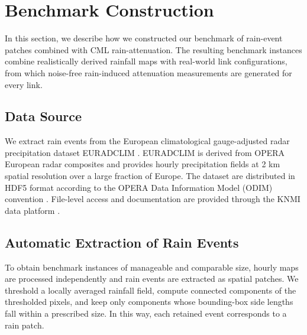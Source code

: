 \documentclass[a4paper,fleqn]{cas-sc}
\newcommand{\notebox}[3]{%
  \begingroup
  \setlength{\fboxsep}{2pt}%
  \fcolorbox{#1}{#2}{\textsf{\footnotesize #3}}%
  \endgroup
}
\DeclareRobustCommand{\editnote}[1]{%
  \texorpdfstring{%
    \nobreak\hfill
    \mbox{\notebox{red!50!black}{red!10}{#1}}%
  }{}%
}
\begin{document}
\section{Benchmark Construction\editnote{GE:stable}}
In this section, we describe how we constructed our benchmark of rain-event patches combined with CML rain-attenuation.  The resulting benchmark instances combine realistically derived rainfall maps with real-world link configurations, from which noise-free rain-induced attenuation measurements are generated for every link.
\subsection{Data Source}
We extract rain events from the European climatological gauge-adjusted radar precipitation dataset EURADCLIM \citep{overeem2023euradclim}. EURADCLIM is derived from OPERA European radar composites and provides hourly precipitation fields at 2 \si{\kilo\meter} spatial resolution over a large fraction of Europe. The dataset are distributed in HDF5 format according to the OPERA Data Information Model (ODIM) convention \citep{odimh5}. File-level access and documentation are provided through the KNMI data platform \citep{knmi_euradclim_project}.

\subsection{Automatic Extraction of Rain Events}
To obtain benchmark instances of manageable and comparable size, hourly maps are processed independently and rain events are extracted as spatial patches. We threshold a locally averaged rainfall field, compute connected components of the thresholded pixels, and keep only components whose bounding-box side lengths fall within a prescribed size. In this way, each retained event corresponds to a rain patch.

\end{document}
